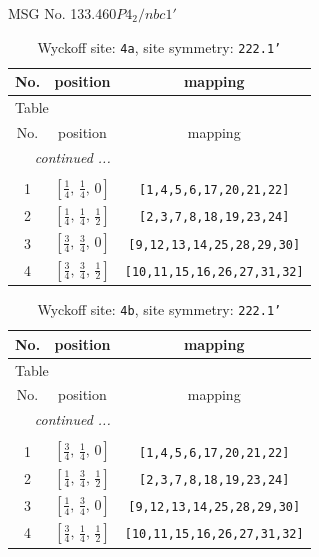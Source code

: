 \documentclass[fleqn,8pt]{jsarticle}
\begin{document}
\setcounter{MaxMatrixCols}{32}

\renewcommand{\tablename}{Table~}
\renewcommand{\figurename}{Figure~}
\begin{center}
\LARGE
MSG No. 133.460\quad$P4_{2}/nbc1'$
\end{center}
\renewcommand{\arraystretch}{1.2}
\begin{longtable}{ccc}
\caption{Wyckoff site: {\tt 4a}, site symmetry: {\tt 222.1'}}
 \\
 \hline \hline
No. & position & mapping \\ \hline \endfirsthead

\multicolumn{2}{l}{\tablename\ \thetable{}} \\
 \hline \hline
No. & position & mapping \\ \hline \endhead

 \hline \hline
\multicolumn{2}{r}{\footnotesize\it continued ...} \\ \endfoot

 \hline \hline
\multicolumn{2}{r}{} \\ \endlastfoot

1 & $\left[ \frac{1}{4},\, \frac{1}{4},\, 0 \right]$ & {\tt [1,4,5,6,17,20,21,22]} \\ \hline
2 & $\left[ \frac{1}{4},\, \frac{1}{4},\, \frac{1}{2} \right]$ & {\tt [2,3,7,8,18,19,23,24]} \\ \hline
3 & $\left[ \frac{3}{4},\, \frac{3}{4},\, 0 \right]$ & {\tt [9,12,13,14,25,28,29,30]} \\ \hline
4 & $\left[ \frac{3}{4},\, \frac{3}{4},\, \frac{1}{2} \right]$ & {\tt [10,11,15,16,26,27,31,32]} \\
\end{longtable}
\renewcommand{\arraystretch}{1.2}
\begin{longtable}{ccc}
\caption{Wyckoff site: {\tt 4b}, site symmetry: {\tt 222.1'}}
 \\
 \hline \hline
No. & position & mapping \\ \hline \endfirsthead

\multicolumn{2}{l}{\tablename\ \thetable{}} \\
 \hline \hline
No. & position & mapping \\ \hline \endhead

 \hline \hline
\multicolumn{2}{r}{\footnotesize\it continued ...} \\ \endfoot

 \hline \hline
\multicolumn{2}{r}{} \\ \endlastfoot

1 & $\left[ \frac{3}{4},\, \frac{1}{4},\, 0 \right]$ & {\tt [1,4,5,6,17,20,21,22]} \\ \hline
2 & $\left[ \frac{1}{4},\, \frac{3}{4},\, \frac{1}{2} \right]$ & {\tt [2,3,7,8,18,19,23,24]} \\ \hline
3 & $\left[ \frac{1}{4},\, \frac{3}{4},\, 0 \right]$ & {\tt [9,12,13,14,25,28,29,30]} \\ \hline
4 & $\left[ \frac{3}{4},\, \frac{1}{4},\, \frac{1}{2} \right]$ & {\tt [10,11,15,16,26,27,31,32]} \\
\end{longtable}
\end{document}
